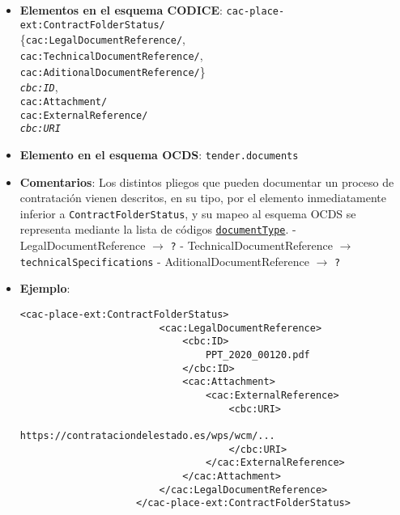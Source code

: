         \begin{itemize}
            \item \textbf{Elementos en el esquema CODICE}:
                \tabto{7.7cm} \texttt{cac-place-ext:ContractFolderStatus/} \\
                \tabto{7.7cm} \{\texttt{cac:LegalDocumentReference/}, \\
                \tabto{7.7cm} \texttt{cac:TechnicalDocumentReference/}, \\
                \tabto{7.7cm} \texttt{cac:AditionalDocumentReference/}\} \\
                \tabto{7.7cm} \texttt{\textit{cbc:ID}},\\
                \tabto{7.7cm} \texttt{cac:Attachment/} \\
                \tabto{7.7cm} \texttt{cac:ExternalReference/} \\
                \tabto{7.7cm} \texttt{\textit{cbc:URI}}
            \item \textbf{Elemento en el esquema OCDS}:
                \tabto{7.7cm} \texttt{tender.documents}
            \item \textbf{Comentarios}: Los distintos pliegos que pueden documentar un proceso de contratación vienen descritos, en su tipo, por el elemento inmediatamente inferior a \texttt{ContractFolderStatus}, y su mapeo al esquema OCDS se representa mediante la lista de códigos \href{https://standard.open-contracting.org/latest/es/schema/codelists/#document-type}{\texttt{documentType}}.
                    \subitem - LegalDocumentReference $\rightarrow$ \texttt{?}
                    \subitem - TechnicalDocumentReference $\rightarrow$ \texttt{technicalSpecifications}
                    \subitem - AditionalDocumentReference $\rightarrow$ \texttt{?}
            \item \textbf{Ejemplo}: \\
                \begin{lstlisting}[language=lXML]
                    <cac-place-ext:ContractFolderStatus>
                        <cac:LegalDocumentReference>
                            <cbc:ID>
                                PPT_2020_00120.pdf
                            </cbc:ID>
                            <cac:Attachment>
                                <cac:ExternalReference>
                                    <cbc:URI>
                                        https://contrataciondelestado.es/wps/wcm/...
                                    </cbc:URI>
                                </cac:ExternalReference>
                            </cac:Attachment>
                        </cac:LegalDocumentReference>
                    </cac-place-ext:ContractFolderStatus>
                \end{lstlisting}
                

\end{itemize}
